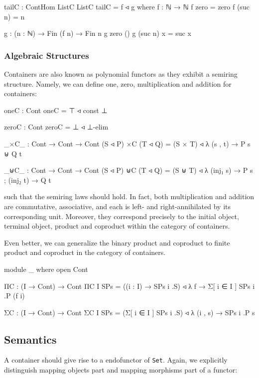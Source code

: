 \begin{code}
tailC : ContHom ListC ListC
tailC = f ◃ g
  where
  f : ℕ → ℕ
  f zero = zero
  f (suc n) = n

  g : (n : ℕ) → Fin (f n) → Fin n
  g zero ()
  g (suc n) x = suc x
\end{code}

\subsubsection*{Algebraic Structures}

Containers are also known as polynomial functors as they exhibit a semiring structure. Namely, we can define one, zero, multiplication and addition for containers:

\begin{code}
oneC : Cont
oneC = ⊤ ◃ const ⊥

zeroC : Cont
zeroC = ⊥ ◃ ⊥-elim

_×C_ : Cont → Cont → Cont
(S ◃ P) ×C (T ◃ Q) = (S × T) ◃ λ (s , t) → P s ⊎ Q t

_⊎C_ : Cont → Cont → Cont
(S ◃ P) ⊎C (T ◃ Q) = (S ⊎ T) ◃ λ{ (inj₁ s) → P s ; (inj₂ t) → Q t }
\end{code}

such that the semiring laws should hold. In fact, both multiplication and addition are commutative, associative, and each is left- and right-annihilated by its corresponding unit. Moreover, they correspond precisely to the initial object, terminal object, product and coproduct within the category of containers.

Even better, we can generalize the binary product and coproduct to finite product and coproduct in the category of containers.

\begin{code}[hide]
module _ where
  open Cont
\end{code}

\begin{code}
  ΠC : (I → Cont) → Cont
  ΠC {I} SPs = ((i : I) → SPs i .S) ◃ λ f → Σ[ i ∈ I ] SPs i .P (f i)

  ΣC : (I → Cont) → Cont
  ΣC {I} SPs = (Σ[ i ∈ I ] SPs i .S) ◃ λ (i , s) → SPs i .P s
\end{code}

\subsection{Semantics}

A container should give rise to a endofunctor of \texttt{Set}. Again, we explicitly distinguish mapping objects part and mapping morphisms part of a functor:

